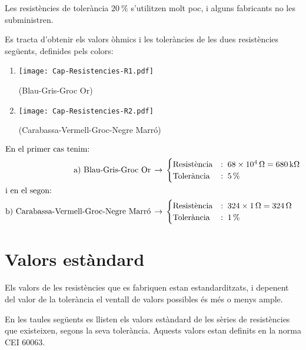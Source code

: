 Les resistències de tolerància $\SI{20}{\%}$ s'utilitzen molt poc, i alguns fabricants no les subministren.


\begin{exemple}
   Es tracta d'obtenir els valors òhmics i les toleràncies de les dues resistències següents,
   definides pels colors:
    \begin{enumerate}
       \renewcommand{\labelenumi}{\alph{enumi})}
       \item \begin{minipage}{1.8cm}
               \texttt{[image: Cap-Resistencies-R1.pdf]}
            \end{minipage} (Blau-Gris-Groc Or)
       \item  \begin{minipage}{1.8cm}
               \texttt{[image: Cap-Resistencies-R2.pdf]}
            \end{minipage} (Carabassa-Vermell-Groc-Negre Marró)
    \end{enumerate}
    \begin{align*}
       \intertext{En el primer cas tenim:}
       \text{a) Blau-Gris-Groc Or}\,  &\rightarrow\,
       \begin{cases}
          \text{Resistència} &:\; \SI{68e4}{\ensuremath{\mathrm{\Omega}}} = \SI{680}{k\ensuremath{\mathrm{\Omega}}} \\
          \text{Tolerància}  &:\; \SI{5}{\%}
       \end{cases} \\
       \intertext{i en el segon:}
       \text{b) Carabassa-Vermell-Groc-Negre Marró}\,  &\rightarrow\,
       \begin{cases}
          \text{Resistència} &:\;324 \times \SI{1}{\ensuremath{\mathrm{\Omega}}} = \SI{324}{\ensuremath{\mathrm{\Omega}}} \\
          \text{Tolerància}  &:\; \SI{1}{\%}
       \end{cases}
    \end{align*}
\end{exemple}

\section{Valors estàndard} 

Els valors de les resistències que es fabriquen estan estandarditzats, i depenent
del valor de la tolerància el ventall de valors possibles és més o menys ample.

En les taules següents es llisten els valors estàndard de les sèries de resistències que existeixen,  segons la seva tolerància. Aquests valors estan definits en la norma CEI 60063.

